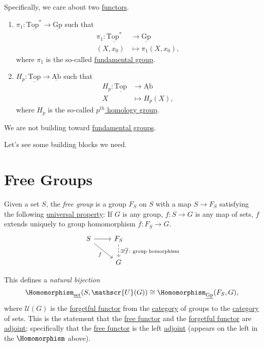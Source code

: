 \begin{remark}
	Specifically, we care about two \hyperref[def:functor]{functors}.
	\begin{enumerate}[(1)]
		\item \(\pi _1\colon \underline{\mathrm{Top}^{\ast}} \to \underline{\mathrm{Gp}}\) such that
		      \[
			      \begin{split}
				      \pi _1\colon \underline{\mathrm{Top}^{\ast}} &\to \underline{\mathrm{Gp}}\\
				      (X, x_0)&\mapsto \pi_1(X, x_0),
			      \end{split}
		      \]
		      where \(\pi _1\) is the so-called \hyperref[def:fundamental-group]{fundamental group}.
		\item \(H_p\colon \underline{\mathrm{Top}} \to \underline{\mathrm{Ab}}\) such that
		      \[
			      \begin{split}
				      H_p\colon \underline{\mathrm{Top}} &\to \underline{\mathrm{Ab}} \\
				      X&\mapsto H_{p} (X),
			      \end{split}
		      \]
		      where \(H_{p}\) is the so-called \hyperref[def:homology-group]{\(p^{th}\) homology group}.
	\end{enumerate}
	We are not building toward \hyperref[def:fundamental-group]{fundamental groups}.
\end{remark}

Let's see some building blocks we need.

\section{Free Groups}
\begin{definition}\label{def:free-group}
	Given a set \(S\), the \emph{free group} is a group \(F_S\) on \(S\) with a map \(S\to F_S\) satisfying the following
	\underline{universal property}: If \(G\) is any group, \(f\colon S\to G\) is any map of sets, \(f\) extends uniquely
	to group homomorphism \(\overline{f} \colon F_S \to G\).
	\[
		\begin{tikzcd}
			S \ar[rd, "f"']\ar[r, ] & F_S\ar[d, dashed, "\exists ! \overline{f} \colon \text{group homorphism} "]\\
			& G
		\end{tikzcd}
	\]
\end{definition}
\begin{note}
	This defines a \emph{natural bijection}
	\[
		\Homomorphism_{\underline{\mathrm{set}}}(S, \mathscr{U}(G))\cong \Homomorphism_{\underline{\mathrm{Gp}}}(F_S, G),
	\]
	where \(\mathscr{U} (G)\) is the \hyperref[eg:forgetful-functor]{forgetful functor} from the
	\hyperref[def:category]{category} of groups to the \hyperref[def:category]{category} of sets. This is the
	statement that the \hyperref[eg:free-functor]{free functor} and the \hyperref[eg:forgetful-functor]{forgetful functor} are \hyperref[def:adjoint-functor]{adjoint};
	specifically that the \hyperref[eg:free-functor]{free functor} is the left \hyperref[def:adjoint-functor]{adjoint} (appears on the left in the \(\Homomorphism\) above).
\end{note}

